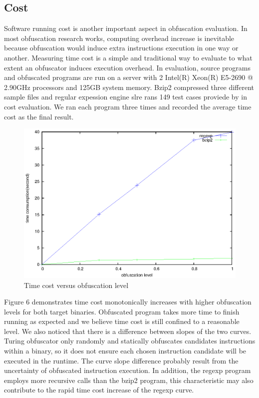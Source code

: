 \documentclass[lnicst]{svmultln}
\begin{document}
\subsection{Cost}
Software running cost is another important aspect in obfuscation evaluation. In most obfuscation research works, computing overhead increase is inevitable because obfuscation would induce extra instructions execution in one way or another. Measuring time cost is a simple and traditional way to evaluate to what extent an obfuscator induces execution overhead. In evaluation, source programs and obfuscated programs are run on a server with 2 Intel(R) Xeon(R) E5-2690 @ 2.90GHz processors and 125GB system memory.  Bzip2 compressed three different sample files and regular expession engine slre rans 149 test cases proviede by \cite{slre} in cost evaluation. We ran each program three times and recorded the average time cost as the final result.
\begin{figure}
  \includegraphics[width=0.9\linewidth]{cost.eps}
  \caption{Time cost versus obfuscation level}
  \label{Figure 6}
\end{figure}

Figure 6 demonstrates time cost monotonically increases with higher obfuscation levels for both target binaries. Obfuscated program takes more time to finish running as expected and we believe time cost is still confined to a reasonable level. We also noticed that there is a difference between slopes of the two curves. Turing obfuscator only randomly and statically obfuscates candidates instructions within a binary, so it does not ensure each chosen instruction candidate will be executed in the runtime. The curve slope difference probably result from the uncertainty of obfuscated instruction execution. In addition, the regexp program employs more recursive calls than the bzip2 program, this characteristic may also contribute to the rapid time cost increase of the regexp curve.
\end{document}
